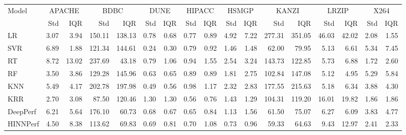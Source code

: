 \begin{tabular}{lrrrrrrrrrrrrrrrr}
\toprule
Model & \multicolumn{2}{c}{APACHE} & \multicolumn{2}{c}{BDBC} & \multicolumn{2}{c}{DUNE} & \multicolumn{2}{c}{HIPACC} & \multicolumn{2}{c}{HSMGP} & \multicolumn{2}{c}{KANZI} & \multicolumn{2}{c}{LRZIP} & \multicolumn{2}{c}{X264} \\
 & Std & IQR & Std & IQR & Std & IQR & Std & IQR & Std & IQR & Std & IQR & Std & IQR & Std & IQR \\
\midrule
LR & 3.07 & 3.94 & 150.11 & 138.13 & 0.78 & 0.68 & 0.77 & 0.89 & 4.92 & 7.22 & 277.31 & 351.05 & 46.03 & 42.02 & 2.08 & 1.55 \\
SVR & 6.89 & 1.88 & 121.34 & 144.61 & 0.24 & 0.30 & 0.79 & 0.92 & 1.46 & 1.48 & 62.00 & 79.95 & 5.13 & 6.61 & 5.34 & 7.45 \\
RT & 8.72 & 13.02 & 237.69 & 43.18 & 0.79 & 1.06 & 0.94 & 1.55 & 2.54 & 3.24 & 143.73 & 122.85 & 5.73 & 6.88 & 1.72 & 2.60 \\
RF & 3.50 & 3.86 & 129.28 & 145.96 & 0.63 & 0.65 & 0.89 & 0.89 & 1.81 & 2.75 & 102.84 & 147.08 & 5.12 & 4.95 & 5.29 & 5.84 \\
KNN & 5.49 & 4.17 & 202.78 & 197.98 & 0.49 & 0.56 & 0.98 & 1.17 & 2.32 & 2.83 & 177.55 & 215.63 & 5.18 & 6.34 & 3.88 & 4.30 \\
KRR & 2.70 & 3.08 & 87.50 & 120.46 & 1.30 & 1.30 & 0.56 & 0.76 & 1.43 & 1.29 & 104.31 & 119.20 & 16.01 & 19.82 & 1.86 & 1.86 \\
DeepPerf & 6.21 & 5.64 & 176.10 & 60.73 & 0.68 & 0.67 & 0.65 & 0.84 & 1.13 & 1.56 & 61.50 & 75.07 & 6.27 & 6.09 & 3.83 & 4.77 \\
HINNPerf & 4.50 & 8.38 & 113.62 & 69.83 & 0.69 & 0.81 & 0.70 & 1.08 & 0.73 & 0.96 & 59.33 & 64.63 & 9.43 & 12.97 & 2.41 & 2.33 \\
\bottomrule
\end{tabular}
